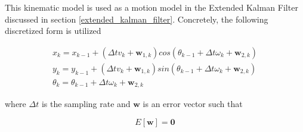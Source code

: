 This kinematic model is used as a motion model in the Extended Kalman Filter discussed in section \ref{extended_kalman_filter}. Concretely, the following discretized 
form is utilized 


\begin{eqnarray}
x_k = x_{k-1} + (\Delta t v_k + \mathbf{w}_{1,k})cos(\theta_{k-1} +  \Delta t \omega_k + \mathbf{w}_{2,k}) \label{equ1} \\
y_k = y_{k-1} + (\Delta t v_k + \mathbf{w}_{1,k})sin(\theta_{k-1} +  \Delta t \omega_k + \mathbf{w}_{2,k}) \label{equ2}\\
\theta_k = \theta_{k -1} + \Delta t \omega_k + \mathbf{w}_{2,k}
\label{equ3}
\end{eqnarray}

where $\Delta t$ is the sampling rate and $\mathbf{w}$ is an error vector such that

\begin{equation}
E[\mathbf{w}] = \mathbf{0}
\end{equation}
